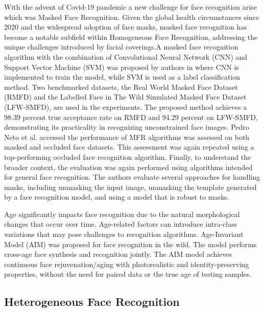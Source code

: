 With the advent of Covid-19 pandemic a new challenge for face recognition arise which was Masked Face Recognition. Given the global health circumstances since 2020 and the widespread adoption of face masks, masked face recognition has become a notable subfield within Homogeneous Face Recognition, addressing the unique challenges introduced by facial coverings.A masked face recognition algorithm with the combination of Convolutional Neural Network (CNN) and Support Vector Machine (SVM) was proposed by authors in \cite{9914874} where CNN is implemented to train the model, while SVM is used as a label classification method. Two benchmarked datasets, the Real World Masked Face Dataset (RMFD) and the Labelled Face in The Wild Simulated Masked Face Dataset (LFW-SMFD), are used in the experiments. The proposed method achieves a 98.39 percent true acceptance rate on RMFD and 94.29 percent on LFW-SMFD, demonstrating its practicality in recognizing unconstrained face images. Pedro Neto et al. \cite{pedro_neto_beyond_2022} accessed the performance of MFR algorithms was assessed on both masked and occluded face datasets. This assessment was again repeated using a top-performing occluded face recognition algorithm. Finally, to understand the broader context, the evaluation was again performed using algorithms intended for general face recognition. The authors evaluate several approaches for handling masks, including unmasking the input image, unmasking the template generated by a face recognition model, and using a model that is robust to masks.

Age significantly impacts face recognition due to the natural morphological changes that occur over time. Age-related factors can introduce intra-class variations that may pose challenges to recognition algorithms. Age-Invariant Model (AIM) \cite{zhao_towards_2022} was proposed for face recognition in the wild. The model performs cross-age face synthesis and recognition jointly. The AIM model achieves continuous face rejuvenation/aging with photorealistic and identity-preserving properties, without the need for paired data or the true age of testing samples.

\subsection{Heterogeneous Face Recognition}

